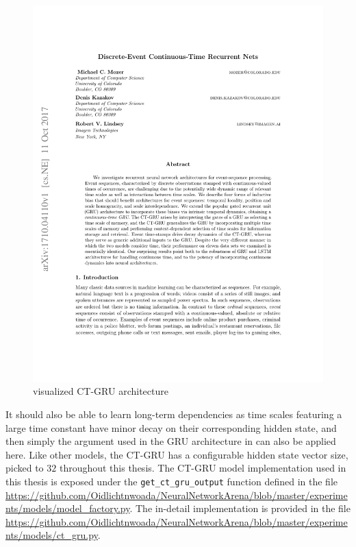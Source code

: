 \documentclass[draft,final]{vutinfth} %
\begin{document}
    \begin{figure}[H]
        \centering{}
        \includegraphics[page=4,width=0.8\linewidth,trim={300 605 150 85},clip]{literature/discrete_event_continuous_time_recurrent_nets.pdf}
        \caption{visualized CT-GRU architecture \cite[p. 4]{CTGRU}}
        \label{fig:ct_gru_vis}
    \end{figure}
    It should also be able to learn long-term dependencies as time scales featuring a large time constant have minor decay on their corresponding hidden state, and then simply the argument used in the GRU architecture in  can also be applied here.
    Like other models, the CT-GRU has a configurable hidden state vector size, picked to $32$ throughout this thesis.
    The CT-GRU model implementation used in this thesis is exposed under the \texttt{get\_ct\_gru\_output} function defined in the file \url{https://github.com/Oidlichtnwoada/NeuralNetworkArena/blob/master/experiments/models/model_factory.py}.
    The in-detail implementation is provided in the file \url{https://github.com/Oidlichtnwoada/NeuralNetworkArena/blob/master/experiments/models/ct_gru.py}.
\end{document}
